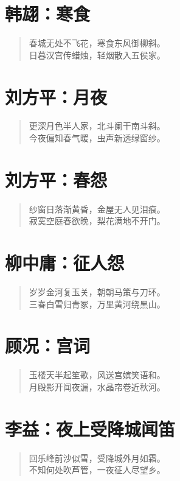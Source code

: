 \documentclass[12pt,oneside]{book}
\newenvironment{shici}{%
\begin{verse}\centering\yanti\large\hspace{12pt}}{\end{verse}}
\begin{document}
\begin{common-format}
\chapter{韩翃：寒食}
\begin{shici}
春城无处不飞花，寒食东风御柳斜。\\
日暮汉宫传蜡烛，轻烟散入五侯家。
\end{shici}

\chapter{刘方平：月夜}
\begin{shici}
更深月色半人家，北斗阑干南斗斜。\\
今夜偏知春气暖，虫声新透绿窗纱。
\end{shici}

\chapter{刘方平：春怨}
\begin{shici}
纱窗日落渐黄昏，金屋无人见泪痕。\\
寂寞空庭春欲晚，梨花满地不开门。
\end{shici}

\chapter{柳中庸：征人怨}
\begin{shici}
岁岁金河复玉关，朝朝马策与刀环。\\
三春白雪归青冢，万里黄河绕黑山。
\end{shici}

\chapter{顾况：宫词}
\begin{shici}
玉楼天半起笙歌，风送宫嫔笑语和。\\
月殿影开闻夜漏，水晶帘卷近秋河。
\end{shici}

\chapter{李益：夜上受降城闻笛}
\begin{shici}
回乐峰前沙似雪，受降城外月如霜。\\
不知何处吹芦管，一夜征人尽望乡。
\end{shici}


\end{common-format}
\end{document}
